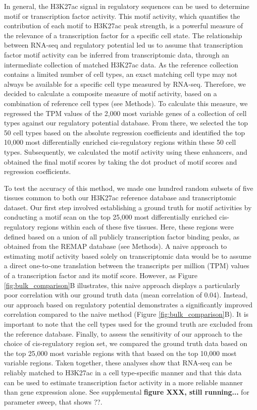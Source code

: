 In general, the H3K27ac signal in regulatory sequences can be used to determine motif or transcription factor activity\cite{FANTOM2009,Balwierz2014,Madsen_2017}. This motif activity, which quantifies the contribution of each motif to H3K27ac peak strength, is a powerful measure of the relevance of a transcription factor for a specific cell state. The relationship between RNA-seq and regulatory potential led us to assume that transcription factor motif activity can be inferred from transcriptomic data, through an intermediate collection of matched H3K27ac data. As the reference collection contains a limited number of cell types, an exact matching cell type may not always be available for a specific cell type measured by RNA-seq. Therefore, we decided to calculate a composite measure of motif activity, based on a combination of reference cell types (see Methods). To calculate this measure, we regressed the TPM values of the 2,000 most variable genes of a collection of cell types against our regulatory potential database. From there, we selected the top 50 cell types based on the absolute regression coefficients and identified the top 10,000 most differentially enriched cis-regulatory regions within these 50 cell types. Subsequently, we calculated the motif activity using these enhancers, and obtained the final motif scores by taking the dot product of motif scores and regression coefficients. 

To test the accuracy of this method, we made one hundred random subsets of five tissues common to both our H3K27ac reference database and transcriptomic dataset. Our first step involved establishing a ground truth for motif activities by conducting a motif scan on the top 25,000 most differentially enriched cis-regulatory regions within each of these five tissues. Here, these regions were defined based on a union of all publicly transcription factor binding peaks, as obtained from the REMAP database\cite{Chneby2017} (see Methods). A naive approach to estimating motif activity based solely on transcriptomic data would be to assume a direct one-to-one translation between the transcripts per million (TPM) values of a transcription factor and its motif score. However, as Figure \ref{fig:bulk_comparison}B illustrates, this naive approach displays a particularly poor correlation with our ground truth data (mean correlation of 0.04). Instead, our approach based on regulatory potential demonstrates a significantly improved correlation compared to the naive method (Figure \ref{fig:bulk_comparison}B). It is important to note that the cell types used for the ground truth are excluded from the reference database. Finally, to assess the sensitivity of our approach to the choice of cis-regulatory region set, we compared the ground truth data based on the top 25,000 most variable regions with that based on the top 10,000 most variable regions. Taken together, these analyses show that RNA-seq can be reliably matched to H3K27ac in a cell type-specific manner and that this data can be used to estimate transcription factor activity in a more reliable manner than gene expression alone. See supplemental \textbf{figure XXX, still running...} for parameter sweep, that shows ??. 

